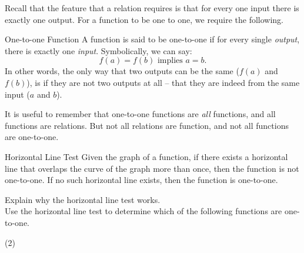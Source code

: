 \documentclass[12pt,fleqn]{book}
\begin{document}
Recall that the feature that a relation requires is that for every one input there is exactly one output. For a function to be one to one, we require the following.
\begin{defn}{One-to-one Function}{}
    A function is said to be one-to-one if for every single \emph{output}, there is exactly one \emph{input}.  Symbolically, we can say:
    \[ 
        f(a)=f(b) \text{ implies } a=b.
    \]
    In other words, the only way that two outputs can be the same ($f(a)$ and $f(b)$), is if they are not two outputs at all -- that they are indeed from the same input ($a$ and $b$).
    \end{defn}

    It is useful to remember that one-to-one functions are \emph{all} functions, and all functions are relations.  But not all relations are function, and not all functions are one-to-one.
    \\[1em]

\begin{defn}{Horizontal Line Test}{}
Given the graph of a function, if there exists a horizontal line that overlaps the curve of the graph more than once, then the function is not one-to-one.  If no such horizontal line exists, then the function is one-to-one.
\end{defn}
Explain why the horizontal line test works.
\\[2in]
Use the horizontal line test to determine which of the following functions are one-to-one.
\begin{tasks}(2)
\task {}
\task {}
\task {}
\task {}
\task {}
\task {}
\end{tasks}
\end{document}
